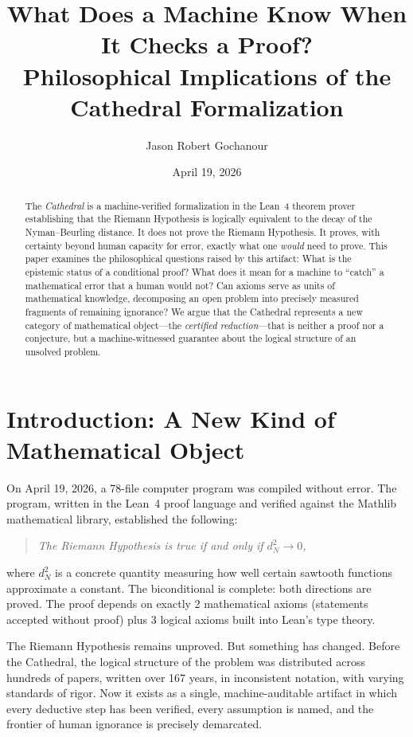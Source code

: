 \documentclass[11pt,a4paper]{article}
\title{%
  What Does a Machine Know When It Checks a Proof?\\[0.3cm]
  {\large Philosophical Implications of the Cathedral Formalization}%
}
\author{
  Jason Robert Gochanour
}
\date{April 19, 2026}
\begin{document}
\maketitle

\begin{abstract}
The \emph{Cathedral} is a machine-verified formalization in the Lean~4
theorem prover establishing that the Riemann Hypothesis is logically
equivalent to the decay of the Nyman--Beurling distance. It does not
prove the Riemann Hypothesis. It proves, with certainty beyond human
capacity for error, exactly what one \emph{would} need to prove.
This paper examines the philosophical questions raised by this
artifact: What is the epistemic status of a conditional proof? What
does it mean for a machine to ``catch'' a mathematical error that a
human would not? Can axioms serve as units of mathematical knowledge,
decomposing an open problem into precisely measured fragments of
remaining ignorance? We argue that the Cathedral represents a new
category of mathematical object---the \emph{certified reduction}---that
is neither a proof nor a conjecture, but a machine-witnessed
guarantee about the logical structure of an unsolved problem.
\end{abstract}

\tableofcontents

\section{Introduction: A New Kind of Mathematical Object}

On April 19, 2026, a 78-file computer program was compiled without
error. The program, written in the Lean~4 proof language and verified
against the Mathlib mathematical library, established the following:

\begin{quote}
\emph{The Riemann Hypothesis is true if and only if $d_N^2 \to 0$,}
\end{quote}

\noindent where $d_N^2$ is a concrete quantity measuring how well
certain sawtooth functions approximate a constant. The biconditional
is complete: both directions are proved. The proof depends on exactly
2 mathematical axioms (statements accepted without proof) plus 3
logical axioms built into Lean's type theory.

The Riemann Hypothesis remains unproved. But something has changed.
Before the Cathedral, the logical structure of the problem was
distributed across hundreds of papers, written over 167 years, in
inconsistent notation, with varying standards of rigor. Now it exists
as a single, machine-auditable artifact in which every deductive
step has been verified, every assumption is named, and the frontier
of human ignorance is precisely demarcated.
\end{document}

